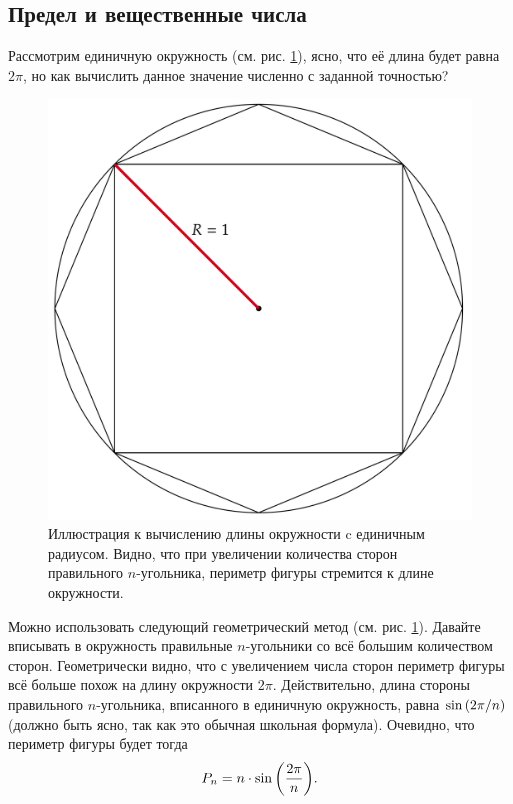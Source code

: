 \documentclass[12pt]{article}
\begin{document}
\subsection{Предел и вещественные числа}
Рассмотрим единичную окружность (см. рис. \ref{fig:4}), ясно, что её длина будет равна $2\pi$, но как вычислить данное значение численно с заданной точностью?  
\begin{figure}
    \centering
    \includegraphics[width = 1\textwidth]{fig4.png}
    \caption{Иллюстрация к вычислению длины окружности c единичным радиусом. Видно, что при увеличении количества сторон правильного $n$\--угольника, периметр фигуры стремится к длине окружности.}
    \label{fig:4}
\end{figure}
\par
Можно использовать следующий геометрический метод (см. рис. \ref{fig:4}). Давайте вписывать в окружность правильные $n$\--угольники со всё большим количеством сторон. Геометрически видно, что с увеличением числа сторон периметр фигуры всё больше похож на длину окружности $2\pi$. Действительно, длина стороны правильного $n$\--угольника, вписанного в единичную окружность, равна $\sin\qty(2\pi/n)$ (должно быть ясно, так как это обычная школьная формула). Очевидно, что периметр фигуры будет тогда
\begin{equation}
    P_n = n \cdot \sin\qty(\dfrac{2\pi}{n}).
\end{equation}
\end{document}
